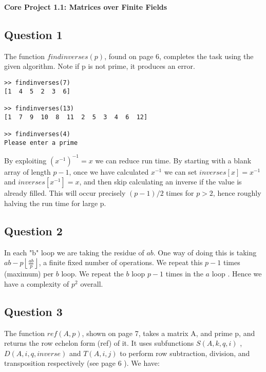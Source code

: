 \documentclass[10pt,a4paper]{report}
\begin{document}
\textbf{Core Project 1.1: Matrices over Finite Fields}
\thispagestyle{empty}

\newpage

\subsection*{Question 1}

The function $findinverses(p)$, found on page 6, completes the task using the given algorithm. Note if p is not prime, it produces an error.\
\begin{verbatim}
>> findinverses(7)
[1  4  5  2  3  6]

>> findinverses(13)
[1  7  9  10  8  11  2  5  3  4  6  12] 

>> findinverses(4)
Please enter a prime
\end{verbatim}

By exploiting $(x^{-1})^{-1} = x$ we can reduce run time. By starting with a blank array of length $p-1$, once we have calculated $x^{-1}$ we can set $inverses[x]=x^{-1}$ and $inverses[x^{-1}]=x$, and then skip calculating an inverse if the value is already filled. This will occur precisely $(p-1)/2$ times for $p>2$, hence roughly halving the run time for large p.
	
\subsection*{Question 2}
In each "b" loop we are taking the residue of $ab$. One way of doing this is taking $ab-p\left \lfloor{\frac{ab}{p}}\right \rfloor $, a finite fixed number of operations. We repeat this $p-1$ times (maximum) per $b$ loop. We repeat the $b$ loop $p-1$ times in the $a$ loop . Hence we have a complexity of $p^2$ overall.


\subsection*{Question 3}

The function $ref(A,p)$, shown on page 7, takes a matrix A, and prime p, and returns the row echelon form (ref) of it. It uses subfunctions $S(A,k,q,i)$ , $D(A,i,q,inverse)$ and $T(A,i,j)$ to perform row subtraction, division, and transposition respectively (see page 6 ). We have:

\vspace{5mm}
\end{document}
